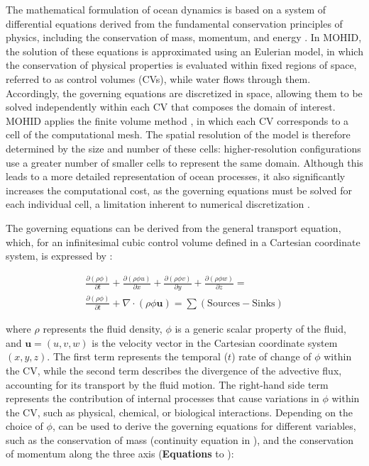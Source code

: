 The mathematical formulation of ocean dynamics is based on a system of differential equations derived from the fundamental conservation principles of physics, including the conservation of mass, momentum, and energy \parencite{kampf2009ocean}. In MOHID, the solution of these equations is approximated using an Eulerian model, in which the conservation of physical properties is evaluated within fixed regions of space, referred to as control volumes (CVs), while water flows through them. Accordingly, the governing equations are discretized in space, allowing them to be solved independently within each CV that composes the domain of interest. MOHID applies the finite volume method \parencite{martins1998three}, in which each CV corresponds to a cell of the computational mesh. The spatial resolution of the model is therefore determined by the size and number of these cells: higher-resolution configurations use a greater number of smaller cells to represent the same domain. Although this leads to a more detailed representation of ocean processes, it also significantly increases the computational cost, as the governing equations must be solved for each individual cell, a limitation inherent to numerical discretization \parencite{tang2021modeling}.

The governing equations can be derived from the general transport equation, which, for an infinitesimal cubic control volume defined in a Cartesian coordinate system, is expressed by  \parencite{versteeg2007introduction, kampf2009ocean}:

\begin{equation} \label{eq:cp1_transport}
\begin{aligned}
    \frac{\partial(\rho\phi)}{\partial t}
    + \frac{\partial(\rho\phi u)}{\partial x}
    + \frac{\partial(\rho\phi v)}{\partial y}
    + \frac{\partial(\rho\phi w)}{\partial z} = \\
    \frac{\partial(\rho\phi)}{\partial t}
    + \nabla \cdot (\rho\phi \mathbf{u}) = 
    \sum \left( \text{Sources} - \text{Sinks} \right)
\end{aligned}
\end{equation}

where $\rho$ represents the fluid density, $\phi$ is a generic scalar property of the fluid, and $\mathbf{u} = (u, v, w)$ is the velocity vector in the Cartesian coordinate system $(x, y, z)$. The first term represents the temporal ($t$) rate of change of $\phi$ within the CV, while the second term describes the divergence of the advective flux, accounting for its transport by the fluid motion. The right-hand side term represents the contribution of internal processes that cause variations in $\phi$ within the CV, such as physical, chemical, or biological interactions. Depending on the choice of $\phi$,  can be used to derive the governing equations for different variables, such as the conservation of mass (continuity equation in ), and the conservation of momentum along the three axis (\textbf{Equations}  to ):

